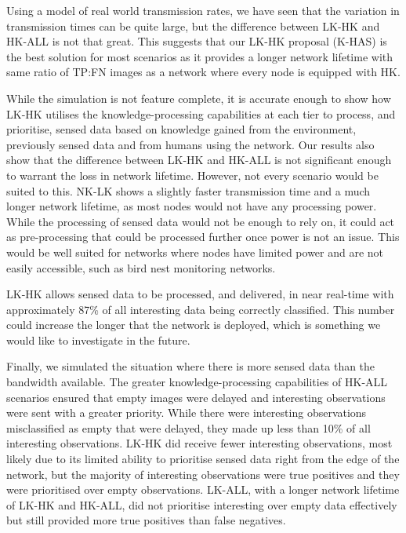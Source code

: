 Using a model of real world transmission rates, we have seen that the variation in transmission times can be quite large, but the difference between LK-HK and HK-ALL is not that great. This suggests that our LK-HK proposal (K-HAS) is the best solution for most scenarios as it provides a longer network lifetime with same ratio of TP:FN images as a network where every node is equipped with HK.

While the simulation is not feature complete, it is accurate enough to show how LK-HK utilises the knowledge-processing capabilities at each tier to process, and prioritise, sensed data based on knowledge gained from the environment, previously sensed data and from humans using the network. Our results also show that the difference between LK-HK and HK-ALL is  not significant enough to warrant the loss in network lifetime. However, not every scenario would be suited to this. NK-LK shows a slightly faster transmission time and a much longer network lifetime, as most nodes would not have any processing power. While the processing of sensed data would not be enough to rely on, it could act as pre-processing that could be processed further once power is not an issue. This would be well suited for networks where nodes have limited power and are not easily accessible, such as bird nest monitoring networks. 

LK-HK allows sensed data to be processed, and delivered, in near real-time with approximately 87\% of all interesting data being correctly classified. This number could increase the longer that the network is deployed, which is something we would like to investigate in the future.

Finally, we simulated the situation where there is more sensed data than the bandwidth available. The greater knowledge-processing capabilities of HK-ALL scenarios ensured that empty images were delayed and interesting observations were sent with a greater priority. While there were interesting observations misclassified as empty that were delayed, they made up less than 10\% of all interesting observations. LK-HK did receive fewer interesting observations, most likely due to its limited ability to prioritise sensed data right from the edge of the network, but the majority of interesting observations were true positives and they were prioritised over empty observations. LK-ALL, with a longer network lifetime of LK-HK and HK-ALL, did not prioritise interesting over empty data effectively but still provided more true positives than false negatives.

